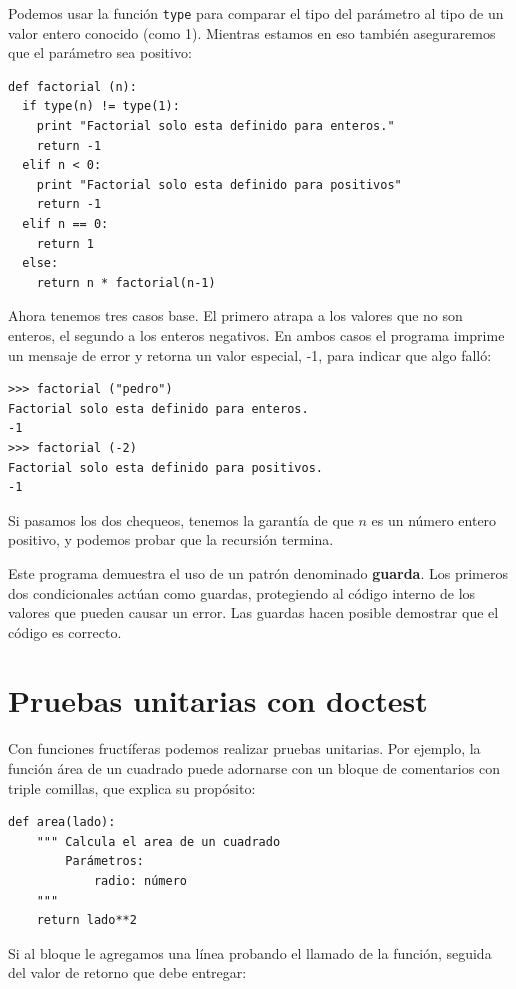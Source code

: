 
Podemos usar la función  \texttt{type} para comparar el tipo
del parámetro al tipo de un valor entero conocido (como 1).  
Mientras estamos en eso también aseguraremos que el parámetro
sea positivo:

\beforeverb
\begin{verbatim}
def factorial (n):
  if type(n) != type(1):
    print "Factorial solo esta definido para enteros."
    return -1
  elif n < 0:
    print "Factorial solo esta definido para positivos"
    return -1
  elif n == 0:
    return 1
  else:
    return n * factorial(n-1)
\end{verbatim}
\afterverb
%
Ahora tenemos tres casos base. El primero atrapa a los valores
que no son enteros, el segundo a los enteros negativos.
En ambos casos el programa imprime un mensaje de error y retorna
un valor especial, -1, para indicar que algo falló:

\beforeverb
\begin{verbatim}
>>> factorial ("pedro")
Factorial solo esta definido para enteros.
-1
>>> factorial (-2)
Factorial solo esta definido para positivos.
-1
\end{verbatim}
\afterverb
%
Si pasamos los dos chequeos, tenemos la garantía de que $n$ es 
un número entero  positivo, y podemos probar que la recursión termina.

Este programa demuestra el uso de un patrón denominado {\bf guarda}.
Los primeros dos condicionales actúan como guardas, protegiendo al 
código interno de los valores que pueden causar un error. Las 
guardas hacen posible demostrar que el código es correcto.

\section{Pruebas unitarias con doctest}

Con funciones fructíferas podemos realizar pruebas unitarias. Por ejemplo, 
la función área de un cuadrado puede adornarse con un bloque 
de comentarios con triple comillas, que explica su propósito:

\beforeverb
\begin{verbatim}
def area(lado):
    """ Calcula el area de un cuadrado
        Parámetros:
            radio: número
    """
    return lado**2
\end{verbatim}
\afterverb

Si al bloque le agregamos una línea probando el llamado de la función, 
seguida del valor de retorno que debe entregar:

